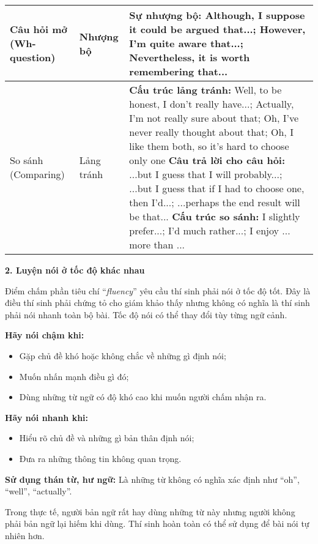 \begin{tabularx}{\textwidth}{|>{\raggedright\arraybackslash}p{}|
                                 >{\raggedright\arraybackslash}p{}|
                                 >{\raggedright\arraybackslash}X|}
Câu hỏi mở (Wh-question) &
Nhượng bộ &
\textbf{Sự nhượng bộ:} Although, I suppose it could be argued that...; However, I'm quite aware that...; Nevertheless, it is worth remembering that... \\
\hline

So sánh (Comparing) &
Lảng tránh &
\textbf{Cấu trúc lảng tránh:} Well, to be honest, I don't really have...; Actually, I'm not really sure about that; Oh, I've never really thought about that; Oh, I like them both, so it's hard to choose only one \newline
\textbf{Câu trả lời cho câu hỏi:} ...but I guess that I will probably...; ...but I guess that if I had to choose one, then I'd...; ...perhaps the end result will be that... \newline
\textbf{Cấu trúc so sánh:} I slightly prefer...; I'd much rather...; I enjoy ... more than ... \\
\hline
\end{tabularx}

\textbf{2. Luyện nói ở tốc độ khác nhau}  

\vspace{.25cm}
Điểm chấm phần tiêu chí ``\textit{fluency}'' yêu cầu thí sinh phải nói ở tốc độ tốt. 
Đây là điều thí sinh phải chứng tỏ cho giám khảo thấy nhưng không có nghĩa là thí sinh phải nói nhanh toàn bộ bài. 
Tốc độ nói có thể thay đổi tùy từng ngữ cảnh.  

\textbf{Hãy nói chậm khi:}
\begin{itemize}
    \item Gặp chủ đề khó hoặc không chắc về những gì định nói;
    \item Muốn nhấn mạnh điều gì đó;
    \item Dùng những từ ngữ có độ khó cao khi muốn người chấm nhận ra.
\end{itemize}

\textbf{Hãy nói nhanh khi:}
\begin{itemize}
    \item Hiểu rõ chủ đề và những gì bản thân định nói;
    \item Đưa ra những thông tin không quan trọng.
\end{itemize}

\textbf{Sử dụng thán từ, hư ngữ:}  
Là những từ không có nghĩa xác định như ``oh'', ``well'', ``actually''. 

\vspace{.25cm}
Trong thực tế, người bản ngữ rất hay dùng những từ này nhưng người không phải bản ngữ lại hiếm khi dùng. 
Thí sinh hoàn toàn có thể sử dụng để bài nói tự nhiên hơn.  

